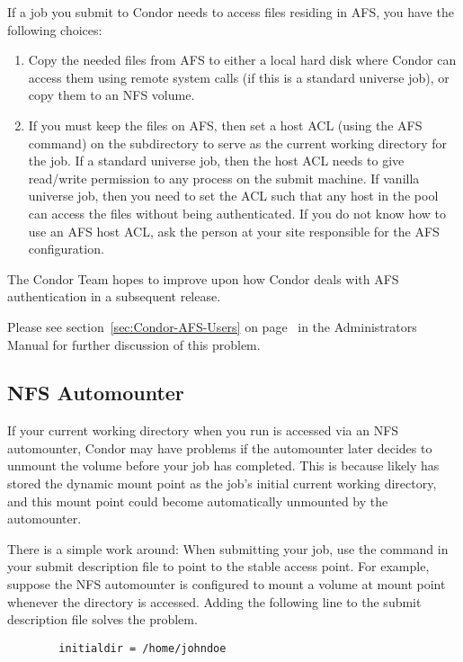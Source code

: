 If a job you submit to Condor needs to access files residing in AFS,
you have the following choices:
\begin{enumerate}
\item Copy the needed files from AFS to either a local hard disk where 
Condor can access them using remote system calls (if
this is a standard universe job), or copy them to an NFS volume.
\item If you must keep the files on AFS, then set a host ACL
(using the AFS  command) on the subdirectory to
serve as the current working directory for the job.
If a standard universe job, then the host ACL needs
to give read/write permission to any process on the submit machine.
If vanilla universe job, then you need to set the ACL such that any host 
in the pool can access the files without being authenticated.
If you do not know how to use an AFS host ACL, ask the person at your 
site responsible for the AFS configuration.
\end{enumerate}

The Condor Team hopes to improve upon how Condor deals with AFS 
authentication in a subsequent release.

Please see section~\ref{sec:Condor-AFS-Users} on
page~\pageref{sec:Condor-AFS-Users} in the Administrators Manual for
further discussion of this problem.

\subsection{NFS Automounter}

If your current working directory when you run 
is accessed via an NFS automounter, Condor may have problems if the
automounter later decides to unmount the volume before your job has
completed.
This is because  likely has stored the
dynamic mount point as the job's initial current working directory, and
this mount point could become automatically unmounted by the
automounter.

There is a simple work around: When submitting your job, use the 
 command in your submit description file to point to
the stable access point.
For example,
suppose the NFS automounter is configured to mount a volume at mount point
whenever the directory  is accessed.
Adding the following line to the
submit description file solves the problem.
\begin{verbatim}
        initialdir = /home/johndoe
\end{verbatim}

